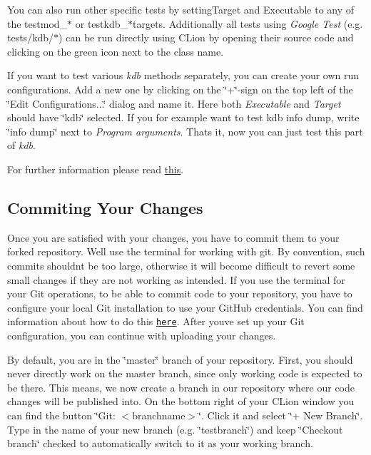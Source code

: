 You can also run other specific tests by setting{\ttfamily Target} and {\ttfamily Executable} to any of the {\ttfamily testmod\+\_\+$\ast$} or {\ttfamily testkdb\+\_\+$\ast$}targets. Additionally all tests using {\itshape Google Test} (e.\+g. tests/kdb/$\ast$) can be run directly using C\+Lion by opening their source code and clicking on the green icon next to the class name.

If you want to test various {\itshape kdb} methods separately, you can create your own run configurations. Add a new one by clicking on the \char`\"{}+\char`\"{}-\/sign on the top left of the \char`\"{}\+Edit Configurations...\char`\"{} dialog and name it. Here both {\itshape Executable} and {\itshape Target} should have \char`\"{}kdb\char`\"{} selected. If you for example want to test {\ttfamily kdb info dump}, write \char`\"{}info dump\char`\"{} next to {\itshape Program arguments}. That\textquotesingle{}s it, now you can just test this part of {\itshape kdb}.

For further information please read \hyperlink{doc_TESTING_md}{this}.

\subsection*{Commiting Your Changes}

Once you are satisfied with your changes, you have to commit them to your forked repository. We\textquotesingle{}ll use the terminal for working with git. By convention, such commits shouldn\textquotesingle{}t be too large, otherwise it will become difficult to revert some small changes if they are not working as intended. If you use the terminal for your Git operations, to be able to commit code to your repository, you have to configure your local Git installation to use your Git\+Hub credentials. You can find information about how to do this \href{https://help.github.com/en/articles/set-up-git}{\tt here}. After you\textquotesingle{}ve set up your Git configuration, you can continue with uploading your changes.

By default, you are in the \char`\"{}master\char`\"{} branch of your repository. First, you should never directly work on the master branch, since only working code is expected to be there. This means, we now create a branch in our repository where our code changes will be published into. On the bottom right of your C\+Lion window you can find the button \char`\"{}\+Git\+: $<$branchname$>$\char`\"{}. Click it and select \char`\"{}+ New Branch\char`\"{}. Type in the name of your new branch (e.\+g. \char`\"{}testbranch\char`\"{}) and keep \char`\"{}\+Checkout branch\char`\"{} checked to automatically switch to it as your working branch.

